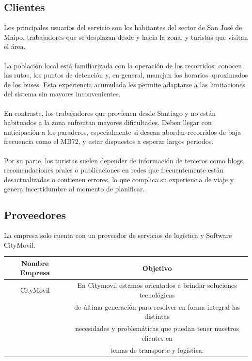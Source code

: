 \documentclass[12pt]{article}
\begin{document}
    \subsection{Clientes}
    Los principales usuarios del servicio son los habitantes del sector de San José de Maipo, trabajadores que se desplazan desde y hacia la zona, y turistas que visitan el área. 
    \\\\
    La población local está familiarizada con la operación de los recorridos: conocen las rutas, los puntos de detención y, en general, manejan los horarios aproximados de los buses. Esta experiencia acumulada les permite adaptarse a las limitaciones del sistema sin mayores inconvenientes.
    \\\\
    En contraste, los trabajadores que provienen desde Santiago y no están habituados a la zona enfrentan mayores dificultades. Deben llegar con anticipación a los paraderos, especialmente si desean abordar recorridos de baja frecuencia como el MB72, y estar dispuestos a esperar largos periodos.
    \\\\
    Por su parte, los turistas suelen depender de información de terceros como blogs, recomendaciones orales o publicaciones en redes que frecuentemente están desactualizadas o contienen errores, lo que complica su experiencia de viaje y genera incertidumbre al momento de planificar.

    \subsection{Proveedores}
    La empresa solo cuenta con un proveedor de servicios de logística y Software CityMovil.
    \begin{table}[!h]
        \centering
        \begin{tabular}{|c|c|}
            \hline
             \textbf{Nombre Empresa} & \textbf{Objetivo}  \\
             \hline 
             CityMovil & En Citymovil estamos orientados a brindar soluciones tecnológicas\\
             & de última generación para resolver en forma integral las distintas \\ 
             & necesidades y problemáticas que puedan tener nuestros clientes en \\
             & temas de transporte y logística. \\
             \hline
        \end{tabular}
    \end{table}
\newpage
\end{document}
